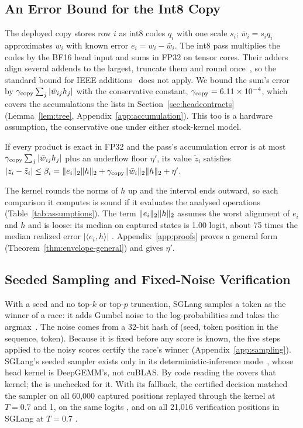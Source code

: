 \subsection{An Error Bound for the Int8 Copy}\label{sec:envelope}\label{sec:accumulation}
The deployed copy stores row $i$ as int8 codes $q_i$ with one scale $s_i$; $\bar w_i=s_iq_i$ approximates $w_i$ with known error $e_i=w_i-\bar w_i$. The int8 pass multiplies the codes by the BF16 head input and sums in FP32 on tensor cores. Their adders align several addends to the largest, truncate them and round once~\cite{fasi2021}, so the standard bound for IEEE additions~\cite{higham2002} does not apply. We bound the sum's error by $\gamma_{\rm copy}\sum_j|\bar w_{ij}h_j|$ with the conservative constant, $\gamma_{\rm copy}=6.11\times10^{-4}$, which covers the accumulations the \modelcons{} lists in Section~\ref{sec:headcontracts} (Lemma~\ref{lem:tree}, Appendix~\ref{app:accumulation}). This too is a hardware assumption, the conservative one under either stock-kernel model.

\begin{theorem}\label{thm:envelope}
If every product is exact in FP32 and the pass's accumulation error is at most $\gamma_{\rm copy}\sum_j|\bar w_{ij}h_j|$ plus an underflow floor $\eta'$, its value $\tilde z_i$ satisfies $|z_i-\tilde z_i|\le\beta_i=\lVert e_i\rVert_2\lVert h\rVert_2+\gamma_{\rm copy}\lVert \bar w_i\rVert_2\lVert h\rVert_2+\eta'$.
\end{theorem}
The kernel rounds the norms of $h$ up and the interval ends outward, so each comparison it computes is sound if it evaluates the analysed operations (Table~\ref{tab:assumptions}). The term $\lVert e_i\rVert_2\lVert h\rVert_2$ assumes the worst alignment of $e_i$ and $h$ and is loose: its median on captured states is 1.00 logit, about 75 times the median realized error $|\langle e_i,h\rangle|$ . Appendix~\ref{app:proofs} proves a general form (Theorem~\ref{thm:envelope-general}) and gives $\eta'$.

\subsection{Seeded Sampling and Fixed-Noise Verification}\label{sec:decisions}\label{sec:race}\label{sec:fixednoise}
With a seed and no top-$k$ or top-$p$ truncation, SGLang samples a token as the winner of a race: it adds Gumbel noise to the log-probabilities and takes the argmax~\cite{sglangsampler}. The noise comes from a 32-bit hash of (seed, token position in the sequence, token). Because it is fixed before any score is known, the five steps applied to the noisy scores certify the race's winner (Appendix~\ref{app:sampling}). SGLang's seeded sampler exists only in its deterministic-inference mode~\cite{sglangdeterministic}, whose head kernel is DeepGEMM's, not cuBLAS. By code reading the \modelcons{} covers that kernel; the \modelhopper{} is unchecked for it. With its fallback, the certified decision matched the sampler on all 60,000 captured positions replayed through the kernel at $T=0.7$ and 1, on the same logits , and on all 21,016 verification positions in SGLang at $T=0.7$ .

